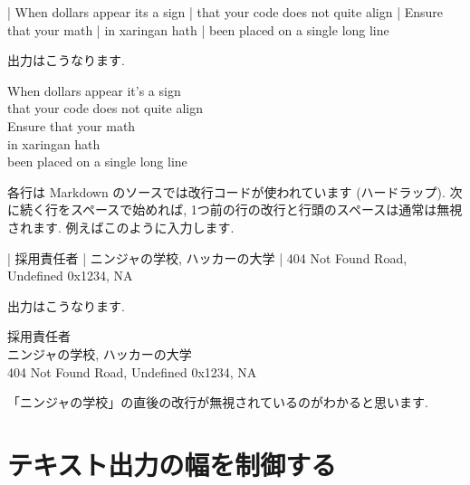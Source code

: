 \documentclass[
  11pt,
  lualatex,
  ja=standard]{bxjsreport}
\newenvironment{Shaded}{\begin{snugshade}}{\end{snugshade}}
\newcommand{\NormalTok}[1]{#1}
\renewenvironment{quote}{\def\FrameCommand{{\color{quotebarcolor}{\vrule width 3pt}}\hspace{10pt}}\MakeFramed{\advance\hsize-\width\FrameRestore}}{\endMakeFramed}
\begin{document}
\begin{Shaded}
\begin{Highlighting}[]
\NormalTok{| When dollars appear it\textquotesingle{}s a sign}
\NormalTok{|   that your code does not quite align  }
\NormalTok{| Ensure that your math  }
\NormalTok{|   in xaringan hath  }
\NormalTok{|   been placed on a single long line}
\end{Highlighting}
\end{Shaded}

出力はこうなります.

\begin{quote}
When dollars appear it's a sign\\
\hspace*{0.333em}\hspace*{0.333em}that your code does not quite align\\
Ensure that your math\\
\hspace*{0.333em}\hspace*{0.333em}in xaringan hath\\
\hspace*{0.333em}\hspace*{0.333em}been placed on a single long line
\end{quote}

各行は Markdown のソースでは改行コードが使われています (ハードラップ). 次に続く行をスペースで始めれば, 1つ前の行の改行と行頭のスペースは通常は無視されます. 例えばこのように入力します.

\begin{Shaded}
\begin{Highlighting}[]
\NormalTok{| 採用責任者}
\NormalTok{| ニンジャの学校,}
\NormalTok{  ハッカーの大学}
\NormalTok{| 404 Not Found Road,}
\NormalTok{  Undefined 0x1234, NA}
\end{Highlighting}
\end{Shaded}

出力はこうなります.

\begin{quote}
採用責任者\\
ニンジャの学校, ハッカーの大学\\
404 Not Found Road, Undefined 0x1234, NA
\end{quote}

「ニンジャの学校」の直後の改行が無視されているのがわかると思います.

\hypertarget{text-width}{%
\section{テキスト出力の幅を制御する}\label{text-width}}
\end{document}
